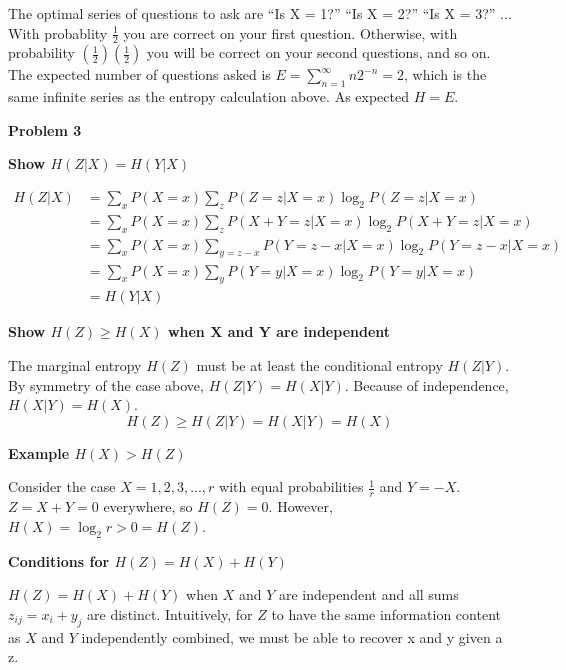 \documentclass[11pt]{article}
\begin{document}
The optimal series of questions to ask are ``Is X = 1?'' ``Is X = 2?'' ``Is X = 3?'' ...
With probablity $\frac12$ you are correct on your first question.  Otherwise, with probability $(\frac12)(\frac12)$ you will be correct on your second questions, and so on.
The expected number of questions asked is $E = \sum_{n=1}^\infty n 2^{-n} = 2$, which is the same infinite series as the entropy calculation above.  As expected $H = E$.

\pagebreak

\noindent \textbf{Problem 3}

\medskip

\noindent \textbf{Show $H(Z|X) = H(Y|X)$}

\begin{align*}
H(Z|X) &= \sum_x P(X=x) \sum_z P(Z=z|X=x) \log_2 P(Z=z|X=x)\\
&= \sum_x P(X=x) \sum_z P(X+Y=z|X=x) \log_2 P(X+Y=z|X=x)\\
&= \sum_x P(X=x) \sum_{y=z-x} P(Y=z-x|X=x) \log_2 P(Y=z-x|X=x)\\
&= \sum_x P(X=x) \sum_y P(Y=y|X=x) \log_2 P(Y=y|X=x)\\
&= H(Y|X)
\end{align*}

\medskip

\noindent \textbf{Show $H(Z) \ge H(X)$ when X and Y are independent}

The marginal entropy $H(Z)$ must be at least the conditional entropy $H(Z | Y)$.  By symmetry of the case above, $H(Z | Y) = H(X | Y)$.  Because of independence, $H(X | Y) = H(X)$.
$$H(Z) \ge H(Z | Y) = H(X | Y) = H(X)$$

\medskip

\noindent \textbf{Example $H(X) > H(Z)$}

Consider the case $X = 1, 2, 3, ..., r$ with equal probabilities $\frac1r$ and $Y = -X$.  $Z = X + Y = 0$ everywhere, so $H(Z) = 0$.  However, $H(X) = \log_2 r > 0 = H(Z)$.

\medskip

\noindent \textbf{Conditions for $H(Z) = H(X) + H(Y)$}

$H(Z) = H(X) + H(Y)$ when $X$ and $Y$ are independent and all sums $z_{ij} = x_i + y_j$ are distinct.  Intuitively, for $Z$ to have the same information content as $X$ and $Y$ independently combined, we must be able to recover x and y given a z.
\end{document}
